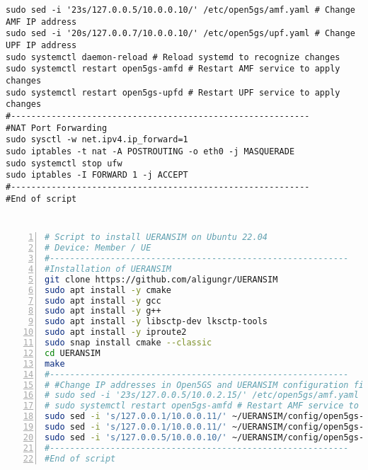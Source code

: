 \begin{lstlisting}
sudo sed -i '23s/127.0.0.5/10.0.0.10/' /etc/open5gs/amf.yaml # Change AMF IP address
sudo sed -i '20s/127.0.0.7/10.0.0.10/' /etc/open5gs/upf.yaml # Change UPF IP address
sudo systemctl daemon-reload # Reload systemd to recognize changes
sudo systemctl restart open5gs-amfd # Restart AMF service to apply changes
sudo systemctl restart open5gs-upfd # Restart UPF service to apply changes
#-----------------------------------------------------------
#NAT Port Forwarding
sudo sysctl -w net.ipv4.ip_forward=1
sudo iptables -t nat -A POSTROUTING -o eth0 -j MASQUERADE
sudo systemctl stop ufw
sudo iptables -I FORWARD 1 -j ACCEPT
#-----------------------------------------------------------
#End of script
\end{lstlisting}

\section{}

\begin{lstlisting}[basicstyle=\small, frame=single, breaklines=true, postbreak=\mbox{\textcolor{red}{$\hookrightarrow$}\space}, escapeinside ={\%,}, escapechar={!}, numbers=left, language=sh, caption=Vagrant script voor Member VM of 5G RAN Server]
    # Script to install UERANSIM on Ubuntu 22.04
# Device: Member / UE
#-----------------------------------------------------------
#Installation of UERANSIM
git clone https://github.com/aligungr/UERANSIM
sudo apt install -y cmake
sudo apt install -y gcc
sudo apt install -y g++
sudo apt install -y libsctp-dev lksctp-tools
sudo apt install -y iproute2
sudo snap install cmake --classic
cd UERANSIM
make
#-----------------------------------------------------------
# #Change IP addresses in Open5GS and UERANSIM configuration files
# sudo sed -i '23s/127.0.0.5/10.0.2.15/' /etc/open5gs/amf.yaml # Change AMF IP address
# sudo systemctl restart open5gs-amfd # Restart AMF service to apply changes
sudo sed -i 's/127.0.0.1/10.0.0.11/' ~/UERANSIM/config/open5gs-ue.yaml # Change UE IP address
sudo sed -i 's/127.0.0.1/10.0.0.11/' ~/UERANSIM/config/open5gs-gnb.yaml # Change gNB IP address
sudo sed -i 's/127.0.0.5/10.0.0.10/' ~/UERANSIM/config/open5gs-gnb.yaml # Change gNB AMF IP address
#-----------------------------------------------------------
#End of script
\end{lstlisting}